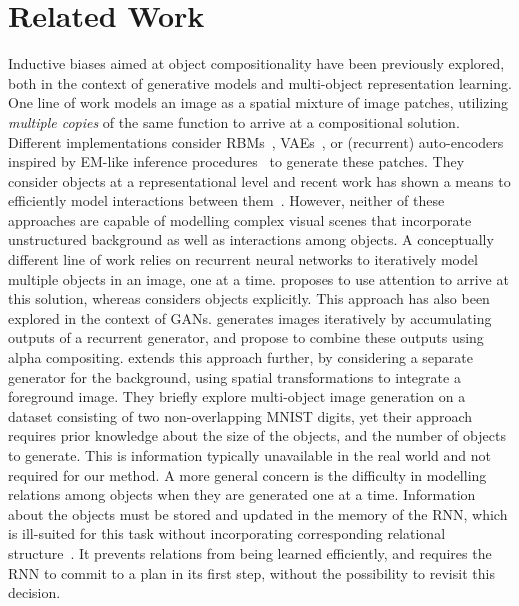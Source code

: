 \documentclass{article}
\begin{document}
\section{Related Work}
Inductive biases aimed at object compositionality have been previously explored, both in the context of generative models and multi-object representation learning.
One line of work models an image as a spatial mixture of image patches, utilizing \emph{multiple copies} of the same function to arrive at a compositional solution.
Different implementations consider RBMs~\citep{le2011learning}, VAEs~\citep{nash17}, or (recurrent) auto-encoders inspired by EM-like inference procedures~\citep{greff2016tagger, greff2017neural} to generate these patches.
They consider objects at a representational level and recent work has shown a means to efficiently model interactions between them~\citep{steenkiste2018relational}.
However, neither of these approaches are capable of modelling complex visual scenes that incorporate unstructured background as well as interactions among objects.
A conceptually different line of work relies on recurrent neural networks to iteratively model multiple objects in an image, one at a time.
\cite{gregor2015draw} proposes to use attention to arrive at this solution, whereas \cite{eslami2016attend} considers objects explicitly.
This approach has also been explored in the context of GANs.
\cite{im2016generating} generates images iteratively by accumulating outputs of a recurrent generator, and \cite{kwak2016generating} propose to combine these outputs using alpha compositing.
\cite{yang2017lr} extends this approach further, by considering a separate generator for the background, using spatial transformations to integrate a foreground image.
They briefly explore multi-object image generation on a dataset consisting of two non-overlapping MNIST digits, yet their approach requires prior knowledge about the size of the objects, and the number of objects to generate.
This is information typically unavailable in the real world and not required for our method.
A more general concern is the difficulty in modelling relations among objects when they are generated one at a time.
Information about the objects must be stored and updated in the memory of the RNN, which is ill-suited for this task without incorporating corresponding relational structure~\citep{santoro2018relational}.
It prevents relations from being learned efficiently, and requires the RNN to commit to a plan in its first step, without the possibility to revisit this decision.
\end{document}
